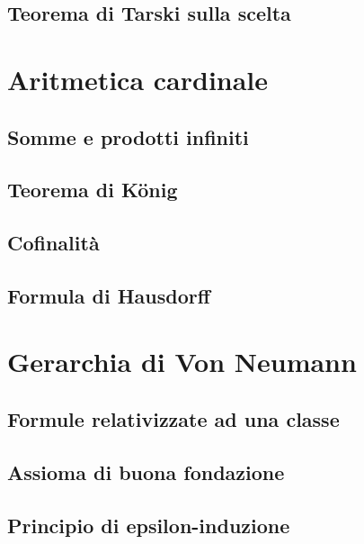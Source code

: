 \documentclass[11pt]{scrartcl}
\begin{document}
\subsection{Teorema di Tarski sulla scelta}









\newpage
\section{Aritmetica cardinale}
\subsection{Somme e prodotti infiniti}
\newpage
\subsection{Teorema di König}
\newpage
\subsection{Cofinalità}
\newpage
\subsection{Formula di Hausdorff}






\newpage
\section{Gerarchia di Von Neumann}
\subsection{Formule relativizzate ad una classe}
\newpage
\subsection{Assioma di buona fondazione}
\newpage
\subsection{Principio di epsilon-induzione}
\end{document}
